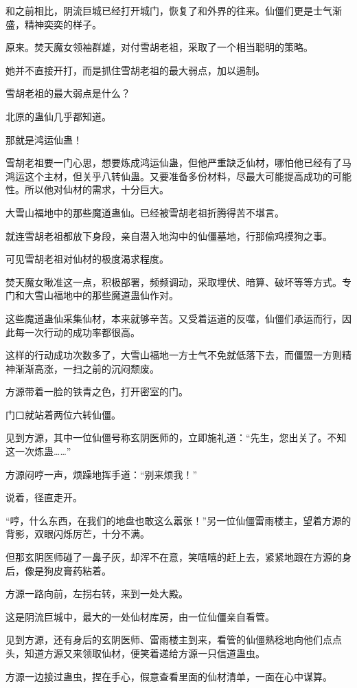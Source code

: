\begin{this_body}
和之前相比，阴流巨城已经打开城门，恢复了和外界的往来。仙僵们更是士气渐盛，精神奕奕的样子。

原来。焚天魔女领袖群雄，对付雪胡老祖，采取了一个相当聪明的策略。

她并不直接开打，而是抓住雪胡老祖的最大弱点，加以遏制。

雪胡老祖的最大弱点是什么？

北原的蛊仙几乎都知道。

那就是鸿运仙蛊！

雪胡老祖要一门心思，想要炼成鸿运仙蛊，但他严重缺乏仙材，哪怕他已经有了马鸿运这个主材，但关乎八转仙蛊。又要准备多份材料，尽最大可能提高成功的可能性。所以他对仙材的需求，十分巨大。

大雪山福地中的那些魔道蛊仙。已经被雪胡老祖折腾得苦不堪言。

就连雪胡老祖都放下身段，亲自潜入地沟中的仙僵墓地，行那偷鸡摸狗之事。

可见雪胡老祖对仙材的极度渴求程度。

焚天魔女瞅准这一点，积极部署，频频调动，采取埋伏、暗算、破坏等等方式。专门和大雪山福地中的那些魔道蛊仙作对。

这些魔道蛊仙采集仙材，本来就够辛苦。又受着运道的反噬，仙僵们承运而行，因此每一次行动的成功率都很高。

这样的行动成功次数多了，大雪山福地一方士气不免就低落下去，而僵盟一方则精神渐渐高涨，一扫之前的沉闷颓废。

方源带着一脸的铁青之色，打开密室的门。

门口就站着两位六转仙僵。

见到方源，其中一位仙僵号称玄阴医师的，立即施礼道：“先生，您出关了。不知这一次炼蛊……”

方源闷哼一声，烦躁地挥手道：“别来烦我！”

说着，径直走开。

“哼，什么东西，在我们的地盘也敢这么嚣张！”另一位仙僵雷雨楼主，望着方源的背影，双眼闪烁厉芒，十分不满。

但那玄阴医师碰了一鼻子灰，却浑不在意，笑嘻嘻的赶上去，紧紧地跟在方源的身后，像是狗皮膏药粘着。

方源一路向前，左拐右转，来到一处大殿。

这是阴流巨城中，最大的一处仙材库房，由一位仙僵亲自看管。

见到方源，还有身后的玄阴医师、雷雨楼主到来，看管的仙僵熟稔地向他们点点头，知道方源又来领取仙材，便笑着递给方源一只信道蛊虫。

方源一边接过蛊虫，捏在手心，假意查看里面的仙材清单，一面在心中谋算。


\end{this_body}

